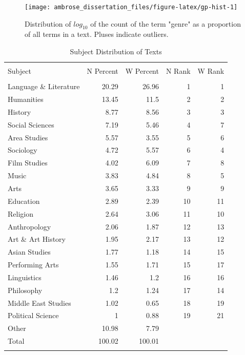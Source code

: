 \documentclass[]{book}
\theoremstyle{definition}
\theoremstyle{definition}
\theoremstyle{definition}
\theoremstyle{remark}
\begin{document}
\begin{figure}

{\centering \texttt{[image: ambrose\_dissertation\_files/figure-latex/gp-hist-1]} 

}

\caption{Distribution of $log_{10}$ of the count of the term "genre" as a proportion of all terms in a text. Pluses indicate outliers.}\label{fig:gp-hist}
\end{figure}

\begin{table}[!htbp] \centering 
  \caption{Subject Distribution of Texts} 
  \label{tab:genre-jsubj} 
\begin{tabular}{@{\extracolsep{5pt}} lrrrr} 
\\[-1.8ex]\hline 
\hline \\[-1.8ex] 
Subject & N Percent & W Percent & N Rank & W Rank \\ 
\hline \\[-1.8ex] 
Language \& Literature & 20.29 & 26.96 & 1 & 1 \\ 
Humanities & 13.45 & 11.5 & 2 & 2 \\ 
History & 8.77 & 8.56 & 3 & 3 \\ 
Social Sciences & 7.19 & 5.46 & 4 & 7 \\ 
Area Studies & 5.57 & 3.55 & 5 & 6 \\ 
Sociology & 4.72 & 5.57 & 6 & 4 \\ 
Film Studies & 4.02 & 6.09 & 7 & 8 \\ 
Music & 3.83 & 4.84 & 8 & 5 \\ 
Arts & 3.65 & 3.33 & 9 & 9 \\ 
Education & 2.89 & 2.39 & 10 & 11 \\ 
Religion & 2.64 & 3.06 & 11 & 10 \\ 
Anthropology & 2.06 & 1.87 & 12 & 13 \\ 
Art \& Art History & 1.95 & 2.17 & 13 & 12 \\ 
Asian Studies & 1.77 & 1.18 & 14 & 15 \\ 
Performing Arts & 1.55 & 1.71 & 15 & 17 \\ 
Linguistics & 1.46 & 1.2 & 16 & 16 \\ 
Philosophy & 1.2 & 1.24 & 17 & 14 \\ 
Middle East Studies & 1.02 & 0.65 & 18 & 19 \\ 
Political Science & 1 & 0.88 & 19 & 21 \\ 
Other & 10.98 & 7.79 &  &  \\ 
Total & 100.02 & 100.01 &  &  \\ 
\hline \\[-1.8ex] 
\end{tabular} 
\end{table}
\end{document}
